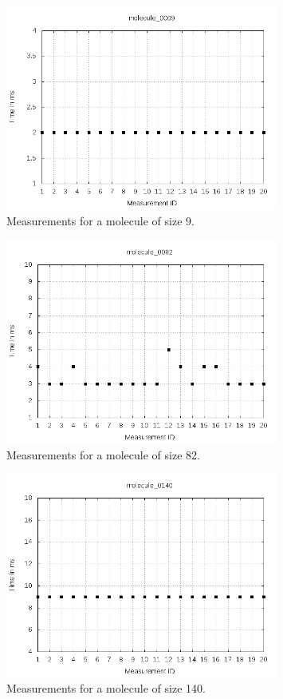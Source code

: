 \documentclass[a4paper,12pt]{article}
\begin{document}
\begin{figure}[!h]
  \centering
    \includegraphics[width=0.8\textwidth]{images/solver-perf-molecule_0009.png}
  \caption{Measurements for a molecule of size 9.}
\end{figure}

\begin{figure}[!h]
  \centering
    \includegraphics[width=0.8\textwidth]{images/solver-perf-molecule_0082.png}
  \caption{Measurements for a molecule of size 82.}
\end{figure}

\begin{figure}[!h]
  \centering
    \includegraphics[width=0.8\textwidth]{images/solver-perf-molecule_0140.png}
  \caption{Measurements for a molecule of size 140.}
\end{figure}
\end{document}
